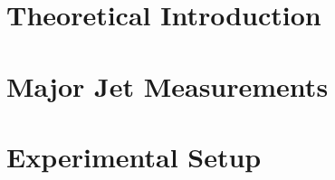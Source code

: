 \documentclass[fullpage, UKenglish]{uiucthesis2009}
\begin{document}
\chapter{Theoretical Introduction}
\label{sec:theory}

\clearpage

\chapter{Major Jet Measurements}
\label{sec:jetMeasurements}

\clearpage

\chapter{Experimental Setup}
\label{sec:setup}

\clearpage
%
%
%
%

%
\end{document}
